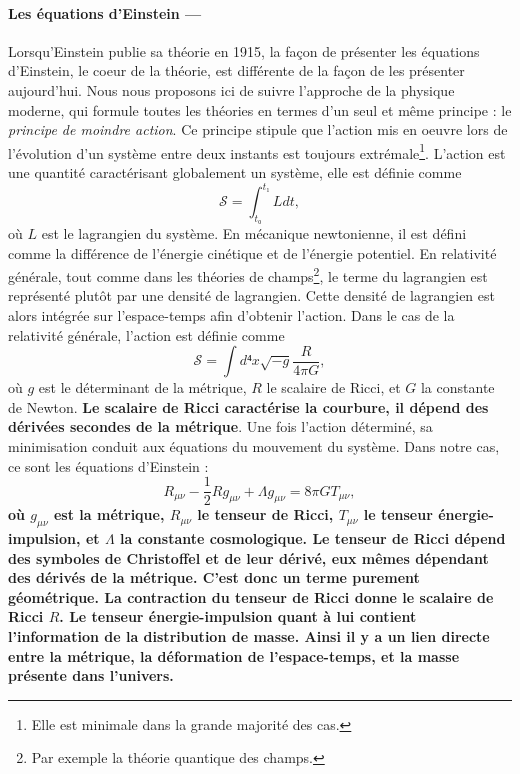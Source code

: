 \documentclass[11pt, twoside, a4paper, openright]{report}
\begin{document}

\paragraph{Les équations d'Einstein —}
Lorsqu'Einstein publie sa théorie en 1915, la façon de présenter les équations d'Einstein, le coeur de la théorie, est différente de la façon de les présenter aujourd'hui. Nous nous proposons ici de suivre l'approche de la physique moderne, qui formule toutes les théories en termes d'un seul et même principe : le \emph{principe de moindre action}. Ce principe stipule que l'action mis en oeuvre lors de l'évolution d'un système entre deux instants est toujours extrémale\footnote{Elle est minimale dans la grande majorité des cas.}. L'action est une quantité caractérisant globalement un système, elle est définie comme
\begin{equation}
  \label{eq:action}
  \mathcal{S} = \int_{t₀}^{t₁} L dt,
\end{equation}
où $L$ est le lagrangien du système. En mécanique newtonienne, il est défini comme la différence de l'énergie cinétique et de l'énergie potentiel. En relativité générale, tout comme dans les théories de champs\footnote{Par exemple la théorie quantique des champs.}, le terme du lagrangien est représenté plutôt par une densité de lagrangien. Cette densité de lagrangien est alors intégrée sur l'espace-temps afin d'obtenir l'action. Dans le cas de la relativité générale, l'action est définie comme
\begin{equation}
  \label{eq:actionrg}
  \mathcal{S} = \int d⁴x \sqrt{-g} \frac{R}{4 \pi G} ,
\end{equation}
où $g$ est le déterminant de la métrique, $R$ le scalaire de Ricci, et $G$ la constante de Newton. \textbf{Le scalaire de Ricci caractérise la courbure, il dépend des dérivées secondes de la métrique}. Une fois l'action déterminé, sa minimisation conduit aux équations du mouvement du système. Dans notre cas, ce sont les équations d'Einstein :
\begin{equation}
  \label{eq:einstein}
  R_{\mu \nu} - \frac{1}{2} R g_{\mu \nu} + \Lambda g_{\mu \nu} = 8 \pi G T_{\mu \nu},
\end{equation}
\textbf{où $g_{\mu \nu}$ est la métrique, $R_{\mu \nu}$ le tenseur de Ricci, $T_{\mu \nu}$ le tenseur énergie-impulsion, et $\Lambda$ la constante cosmologique. Le tenseur de Ricci dépend des symboles de Christoffel et de leur dérivé, eux mêmes dépendant des dérivés de la métrique. C'est donc un terme purement géométrique. La contraction du tenseur de Ricci donne le scalaire de Ricci $R$. Le tenseur énergie-impulsion quant à lui contient l'information de la distribution de masse. Ainsi il y a un lien directe entre la métrique, la déformation de l'espace-temps, et la masse présente dans l'univers.}
\end{document}
